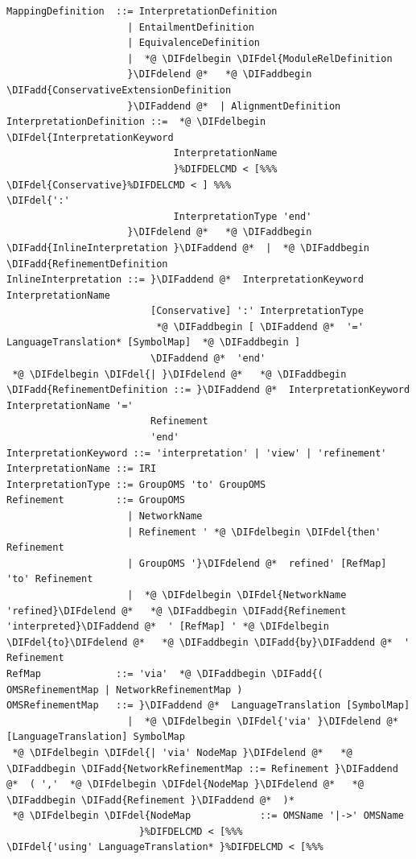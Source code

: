 \documentclass[10pt,fleqn,final]{scrreprt}
\newenvironment{definitions}[0]{\medskip }{}
\providecommand{\DIFadd}[1]{{\protect\color{blue}\uwave{#1}}} %
\providecommand{\DIFdel}[1]{{\protect\color{red}\sout{#1}}}                      %
\providecommand{\DIFaddbegin}{} %
\providecommand{\DIFaddend}{} %
\providecommand{\DIFdelbegin}{} %
\providecommand{\DIFdelend}{} %
\begin{document}
\begin{definitions}
\begin{lstlisting}[language=ebnf,mathescape]
MappingDefinition  ::= InterpretationDefinition
                     | EntailmentDefinition
                     | EquivalenceDefinition
                     |  *@ \DIFdelbegin \DIFdel{ModuleRelDefinition
                     }\DIFdelend @*   *@ \DIFaddbegin \DIFadd{ConservativeExtensionDefinition
                     }\DIFaddend @*  | AlignmentDefinition
InterpretationDefinition ::=  *@ \DIFdelbegin \DIFdel{InterpretationKeyword
                             InterpretationName
                             }%DIFDELCMD < [%%%
\DIFdel{Conservative}%DIFDELCMD < ] %%%
\DIFdel{':'
                             InterpretationType 'end'
                     }\DIFdelend @*   *@ \DIFaddbegin \DIFadd{InlineInterpretation }\DIFaddend @*  |  *@ \DIFaddbegin \DIFadd{RefinementDefinition
InlineInterpretation ::= }\DIFaddend @*  InterpretationKeyword InterpretationName
                         [Conservative] ':' InterpretationType
                          *@ \DIFaddbegin [ \DIFaddend @*  '=' LanguageTranslation* [SymbolMap]  *@ \DIFaddbegin ]
                         \DIFaddend @*  'end'
 *@ \DIFdelbegin \DIFdel{| }\DIFdelend @*   *@ \DIFaddbegin \DIFadd{RefinementDefinition ::= }\DIFaddend @*  InterpretationKeyword InterpretationName '='
                         Refinement
                         'end'
InterpretationKeyword ::= 'interpretation' | 'view' | 'refinement'
InterpretationName ::= IRI
InterpretationType ::= GroupOMS 'to' GroupOMS
Refinement         ::= GroupOMS
                     | NetworkName
                     | Refinement ' *@ \DIFdelbegin \DIFdel{then' Refinement
                     | GroupOMS '}\DIFdelend @*  refined' [RefMap] 'to' Refinement
                     |  *@ \DIFdelbegin \DIFdel{NetworkName 'refined}\DIFdelend @*   *@ \DIFaddbegin \DIFadd{Refinement 'interpreted}\DIFaddend @*  ' [RefMap] ' *@ \DIFdelbegin \DIFdel{to}\DIFdelend @*   *@ \DIFaddbegin \DIFadd{by}\DIFaddend @*  ' Refinement
RefMap             ::= 'via'  *@ \DIFaddbegin \DIFadd{( OMSRefinementMap | NetworkRefinementMap )
OMSRefinementMap   ::= }\DIFaddend @*  LanguageTranslation [SymbolMap]
                     |  *@ \DIFdelbegin \DIFdel{'via' }\DIFdelend @*  [LanguageTranslation] SymbolMap
 *@ \DIFdelbegin \DIFdel{| 'via' NodeMap }\DIFdelend @*   *@ \DIFaddbegin \DIFadd{NetworkRefinementMap ::= Refinement }\DIFaddend @*  ( ','  *@ \DIFdelbegin \DIFdel{NodeMap }\DIFdelend @*   *@ \DIFaddbegin \DIFadd{Refinement }\DIFaddend @*  )*
 *@ \DIFdelbegin \DIFdel{NodeMap            ::= OMSName '|->' OMSName
                       }%DIFDELCMD < [%%%
\DIFdel{'using' LanguageTranslation* }%DIFDELCMD < [%%%

\end{lstlisting}
\end{definitions}
\end{document}
